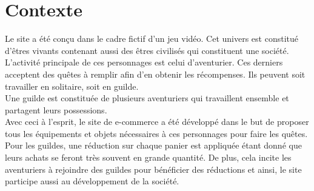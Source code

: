 \section{Contexte}

Le site a été conçu dans le cadre fictif d'un jeu vidéo. Cet univers est 
constitué d'êtres vivants contenant aussi des êtres civilisés qui constituent 
une société. \\

L'activité principale de ces personnages est celui d'aventurier. 
Ces derniers acceptent des quêtes à remplir afin d'en obtenir les récompenses. 
Ils peuvent soit travailler en solitaire, soit en guilde. \\

Une guilde est constituée de plusieurs aventuriers qui travaillent ensemble et 
partagent leurs possessions. \\

Avec ceci à l'esprit, le site de e-commerce a été développé dans le but de 
proposer tous les équipements et objets nécessaires à ces personnages pour faire 
les quêtes. Pour les guildes, une réduction sur chaque panier est appliquée 
étant donné que leurs achats se feront très souvent en grande quantité. De plus, 
cela incite les aventuriers à rejoindre des guildes pour bénéficier des 
réductions et ainsi, le site participe aussi au développement de la société.
